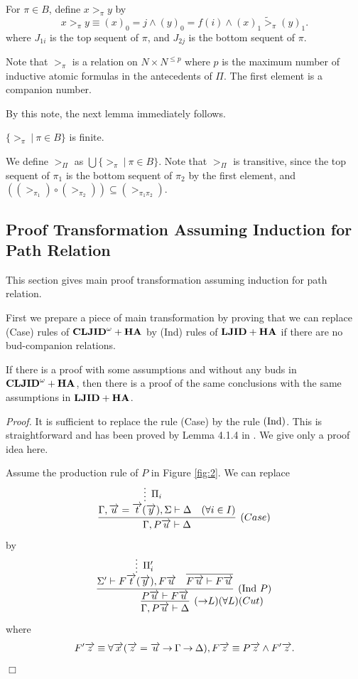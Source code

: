 \begin{Def}\rm\label{def:>}
For $\pi \in B$,
define $x >_{\pi} y$ by
\[
x >_{\pi} y \equiv
(x)_0=j \land (y)_0=f(i) \land  (x)_1 \tilde>_{\pi} (y)_1.
\]
where 
$J_{1i}$ is the top sequent of $\pi$, and
$J_{2j}$ is the bottom sequent of $\pi$.
\end{Def}

Note that $>_{\pi}$ is a relation on $N \times N^{\le p}$ where
$p$ is the maximum number of inductive atomic formulas in the antecedents of $\Pi$.
The first element is a companion number.

By this note, the next lemma immediately follows.
\begin{Lemma}\label{lemma:finite}
$\{ >_{\pi} \ |\ \pi \in B \}$ is finite.
\end{Lemma}

We define $>_\Pi$ as $\bigcup \{ >_{\pi} \ |\ \pi \in B \}$.
Note that $>_\Pi$ is transitive,
since 
the top sequent of $\pi_1$
is the bottom sequent of $\pi_2$ by the first element, and
$((>_{\pi_1}) \circ (>_{\pi_2})) \subseteq (>_{\pi_1\pi_2})$.

\subsection{Proof Transformation Assuming Induction for Path Relation}

This section gives main proof transformation assuming induction for path relation.

First we prepare a piece of main transformation by
proving that we can replace (Case) rules of ${{\bf CLJID}^\omega+{\bf HA}}$ 
by (Ind) rules of ${{\bf LJID}+{\bf HA}}$ if there are no bud-companion relations.

\begin{Lemma}\label{lemma:case-ind}
If there is a proof
with some assumptions
and without any buds in ${{\bf CLJID}^\omega+{\bf HA}}$,
then
there is a proof of the same conclusions with the same assumptions
in ${{\bf LJID}+{\bf HA}}$.
\end{Lemma}

{\em Proof.}
It is sufficient to replace the rule (Case) by the rule $({\rm Ind})$.
This is straightforward and
has been proved by Lemma 4.1.4 in \cite{Brotherston06}.
We give only a proof idea here.

Assume the production rule of $P$ in Figure \ref{fig:2}.
We can replace
{
\[
\infer[(Case)]{\Gamma,P\Vec u \prove \Delta}{
	\infer*[\Pi_i]{\Gamma,\Vec u=\Vec t(\Vec y),\Sigma \prove \Delta}{}
	&
	(\forall i \in I)
}
\]
}
by
{
\[
\infer[(\imp L)(\forall L)(Cut)]{\Gamma,P\Vec u \prove \Delta}{
\infer[(\Ind\ P)]{P\Vec u \prove F\Vec u}{
\infer*[\Pi'_i]{
\Sigma' \prove F\Vec t(\Vec y),F\Vec u}{}
&
\infer{F\Vec u \prove F\Vec u}{}
}}
\]
}
where
\[
F'\overrightarrow z \equiv \forall \overrightarrow x(\overrightarrow z=\overrightarrow u \mathbin \to \Gamma \mathbin \to \Delta), \\
F\overrightarrow z \equiv P\overrightarrow z \land F'\overrightarrow z.
\]
$\Box$

